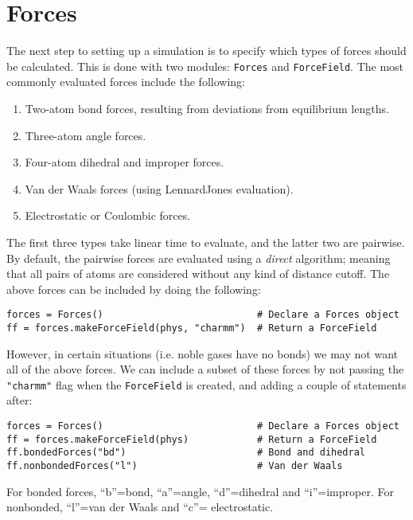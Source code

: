 \documentclass[11pt]{report}
\begin{document}
\section{Forces}

The next step to setting up a simulation is 
to specify which types of forces should be calculated.
This is done with two modules: \texttt{Forces}
and \texttt{ForceField}.  The most commonly evaluated
forces include the following:

\begin{enumerate}
\item Two-atom bond forces, resulting from deviations from
equilibrium lengths.
\item Three-atom angle forces.
\item Four-atom dihedral and improper forces.
\item Van der Waals forces (using LennardJones evaluation).
\item Electrostatic or Coulombic forces.
\end{enumerate}

The first three types take linear time to evaluate, and
the latter two are pairwise.  By default, the pairwise
forces are evaluated using a {\it direct} algorithm; meaning
that all pairs of atoms are considered without any kind
of distance cutoff.  The above forces can be
included by doing the following:

\begin{verbatim}
forces = Forces()                           # Declare a Forces object
ff = forces.makeForceField(phys, "charmm")  # Return a ForceField
\end{verbatim}

However, in certain situations (i.e. noble gases have no bonds)
we may not want all of the above forces.  We can include a subset
of these forces by not passing the \texttt{"charmm"} flag
when the \texttt{ForceField} is created, and adding a couple
of statements after:

\begin{verbatim}
forces = Forces()                           # Declare a Forces object
ff = forces.makeForceField(phys)            # Return a ForceField
ff.bondedForces("bd")                       # Bond and dihedral
ff.nonbondedForces("l")                     # Van der Waals
\end{verbatim}

For bonded forces, ``b''=bond, ``a''=angle, ``d''=dihedral
and ``i''=improper.  For nonbonded, ``l''=van der Waals
and ``c''= electrostatic.
\end{document}
